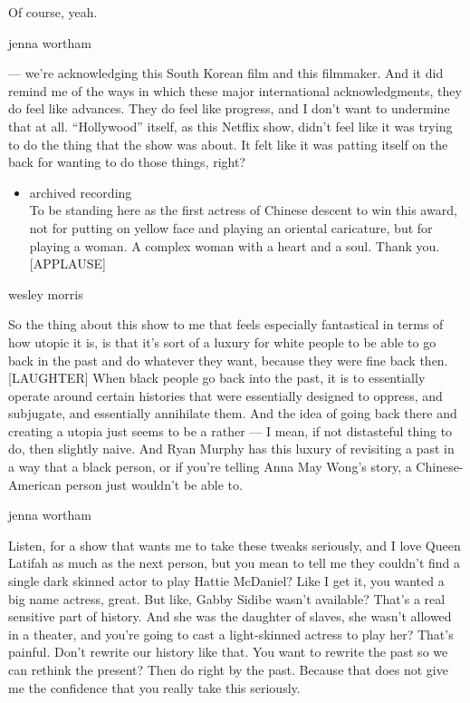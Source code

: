 Of course, yeah.

jenna wortham

--- we're acknowledging this South Korean film and this filmmaker. And
it did remind me of the ways in which these major international
acknowledgments, they do feel like advances. They do feel like progress,
and I don't want to undermine that at all. ``Hollywood'' itself, as this
Netflix show, didn't feel like it was trying to do the thing that the
show was about. It felt like it was patting itself on the back for
wanting to do those things, right?

\begin{itemize}
\tightlist
\item
  archived recording\\
  To be standing here as the first actress of Chinese descent to win
  this award, not for putting on yellow face and playing an oriental
  caricature, but for playing a woman. A complex woman with a heart and
  a soul. Thank you. {[}APPLAUSE{]}
\end{itemize}

wesley morris

So the thing about this show to me that feels especially fantastical in
terms of how utopic it is, is that it's sort of a luxury for white
people to be able to go back in the past and do whatever they want,
because they were fine back then. {[}LAUGHTER{]} When black people go
back into the past, it is to essentially operate around certain
histories that were essentially designed to oppress, and subjugate, and
essentially annihilate them. And the idea of going back there and
creating a utopia just seems to be a rather --- I mean, if not
distasteful thing to do, then slightly naive. And Ryan Murphy has this
luxury of revisiting a past in a way that a black person, or if you're
telling Anna May Wong's story, a Chinese-American person just wouldn't
be able to.

jenna wortham

Listen, for a show that wants me to take these tweaks seriously, and I
love Queen Latifah as much as the next person, but you mean to tell me
they couldn't find a single dark skinned actor to play Hattie McDaniel?
Like I get it, you wanted a big name actress, great. But like, Gabby
Sidibe wasn't available? That's a real sensitive part of history. And
she was the daughter of slaves, she wasn't allowed in a theater, and
you're going to cast a light-skinned actress to play her? That's
painful. Don't rewrite our history like that. You want to rewrite the
past so we can rethink the present? Then do right by the past. Because
that does not give me the confidence that you really take this
seriously.

